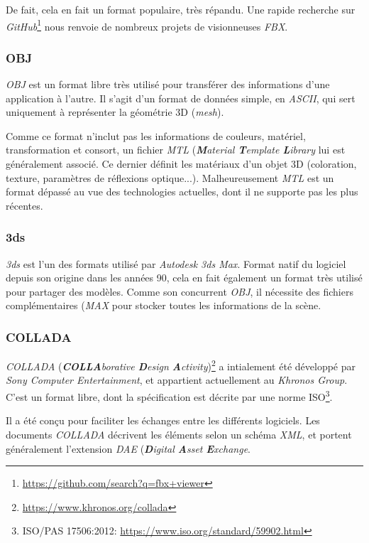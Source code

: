 De fait, cela en fait un format populaire, très répandu.
Une rapide recherche sur \textit{GitHub}\footnote{\url{https://github.com/search?q=fbx+viewer}} nous renvoie de nombreux projets de visionneuses \textit{FBX}.

\subsubsection{OBJ}
\textit{OBJ} est un format libre très utilisé pour transférer des informations d'une application à l'autre. Il s'agit d'un format de données simple, en \textit{ASCII}, qui sert uniquement à représenter la géométrie 3D (\textit{mesh}).

Comme ce format n'inclut pas les informations de couleurs, matériel, transformation et consort, un fichier \textit{MTL} (\textit{\textbf{M}aterial \textbf{T}emplate \textbf{L}ibrary} lui est généralement associé. Ce dernier définit les matériaux d'un objet 3D (coloration, texture, paramètres de réflexions optique...). Malheureusement \textit{MTL} est un format dépassé au vue des technologies actuelles, dont il ne supporte pas les plus récentes.

\subsubsection{3ds}
\textit{3ds} est l'un des formats utilisé par \textit{Autodesk 3ds Max}. Format natif du logiciel depuis son origine dans les années 90, cela en fait également un format très utilisé pour partager des modèles. Comme son concurrent \textit{OBJ}, il nécessite des fichiers complémentaires (\textit{MAX} pour stocker toutes les informations de la scène.

\subsubsection{COLLADA}
\textit{COLLADA} (\textit{\textbf{COLLA}borative \textbf{D}esign \textbf{A}ctivity})\footnote{\url{https://www.khronos.org/collada}} a intialement été développé par \textit{Sony Computer Entertainment}, et appartient actuellement au \textit{Khronos Group}.
C'est un format libre, dont la spécification est décrite par une norme ISO\footnote{ISO/PAS 17506:2012: \url{https://www.iso.org/standard/59902.html}}.

Il a été conçu pour faciliter les échanges entre les différents logiciels. Les documents \textit{COLLADA} décrivent les éléments selon un schéma \textit{XML}, et portent généralement l'extension \textit{DAE} (\textit{\textbf{D}igital \textbf{A}sset \textbf{E}xchange}.

